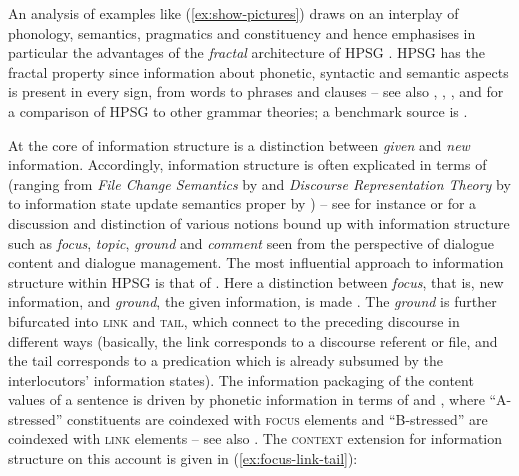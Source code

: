 \documentclass[output=paper
	        ,collection
	        ,collectionchapter
 	        ,biblatex
                ,babelshorthands
                ,newtxmath
                ,draftmode
                ,colorlinks, citecolor=brown
]{langscibook}
\begin{document}
An analysis of examples like (\ref{ex:show-pictures}) draws on an interplay of phonology, semantics, pragmatics and constituency and hence emphasises in particular the advantages of the \emph{fractal} architecture of HPSG \citep{Johnson:Lappin:1999}. 
%
HPSG has the fractal property since
information about phonetic, syntactic and semantic aspects is present in every sign, from words to phrases and clauses \citep[]{Pollard:1997} -- see also , , ,  and  for a comparison of HPSG to other grammar theories; a benchmark source is \citet{MuellerGT-Eng1}.


 
At the core of information structure is a distinction between \emph{given} and \emph{new} information. 
%
Accordingly, information structure is often explicated in terms of  (ranging from \emph{File Change Semantics}  by \citealt{Heim:2002} and \emph{Discourse Representation Theory}  by \citealt{Kamp:Reyle:1993} to information state update semantics proper by \citealt{Traum:Larsson:2003}) -- see for instance \citet{Krifka:2008} or \citet{Vallduv`i2015} for a discussion and distinction of various notions bound up with information structure such as \emph{focus},  \emph{topic},  \emph{ground}  and \emph{comment}  seen from the perspective of dialogue content and dialogue management.
%
The most influential approach to information structure within HPSG is that of \citet{Engdahl:Vallduvi:1996}.
%
Here a distinction between \emph{focus}, that is, new information, and \emph{ground}, the given information, is made \citep[]{Engdahl:Vallduvi:1996}. 
%
The \emph{ground} is further bifurcated into \textsc{link} and \textsc{tail}, which connect to the preceding discourse in different ways (basically, the link corresponds to a discourse referent or file, and the tail corresponds to a predication which is already subsumed by the interlocutors' information states).
%
The information packaging of the content values of a sentence is driven by phonetic information in terms of  and  \citep[Chapter 6]{Jackendoff:1972}, where \enquote{A-stressed} constituents are coindexed with \textsc{focus} elements and \enquote{B-stressed} are coindexed with \textsc{link} elements -- see also .
%
The \textsc{context} extension for information structure on this account is given in (\ref{ex:focus-link-tail}):
%
\ea \label{ex:focus-link-tail}
\z
\end{document}
